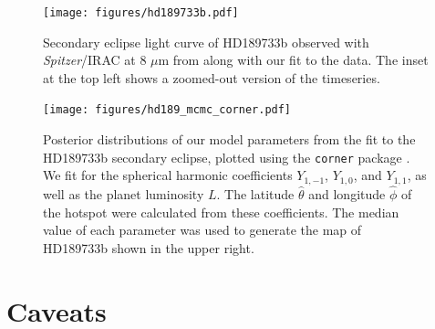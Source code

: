 \documentclass[modern]{aastex61}
\begin{document}
%
\begin{figure}[t!]
    \begin{centering}
    \texttt{[image: figures/hd189733b.pdf]}
    \caption{\label{fig:hd189_mcmc_fit} Secondary eclipse light curve of
             HD189733b observed with \textit{Spitzer}/IRAC at 8 $\mu$m from
             \citet{Knutson2007} along with our fit to the data. The inset
             at the top left shows a zoomed-out version of the timeseries.
             }
    \end{centering}
\end{figure}
%
\begin{figure}[t!]
    \begin{centering}
    \texttt{[image: figures/hd189\_mcmc\_corner.pdf]}
    \caption{\label{fig:hd189_mcmc_corner} Posterior distributions
             of our model parameters from the fit to the HD189733b
             secondary eclipse, plotted using the \texttt{corner} package
             \citep{Foreman-Mackey2016}. We fit for the spherical harmonic
             coefficients $Y_{1,-1}$,
             $Y_{1,0}$, and $Y_{1,1}$, as well as the planet luminosity $L$. The
             latitude $\hat{\theta}$ and longitude $\hat{\phi}$
             of the hotspot were calculated from these coefficients. The median
             value of each parameter was used to generate the map of HD189733b
             shown in the upper right. }
    \end{centering}
\end{figure}
%

\section{Caveats}
\label{sec:caveats}
\end{document}
